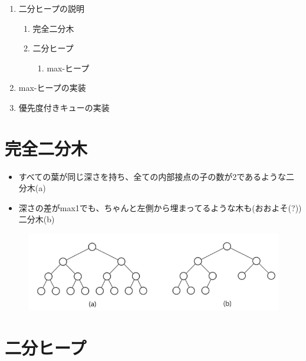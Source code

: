 \documentclass[a4paper,dvipdfmx]{jsarticle}
\makeatletter
\def\maxwidth{\ifdim\Gin@nat@width>\linewidth\linewidth
    \else\Gin@nat@width\fi}
\let\Oldincludegraphics\includegraphics
\renewcommand{\includegraphics}[1]{\Oldincludegraphics[width=.8\maxwidth]{#1}}
\providecommand{\tightlist}{%
      \setlength{\itemsep}{0pt}\setlength{\parskip}{0pt}}
\makeatother
\begin{document}
\begin{enumerate}
\def\labelenumi{\arabic{enumi}.}
\tightlist
\item
  二分ヒープの説明

  \begin{enumerate}
  \def\labelenumii{\arabic{enumii}.}
  \tightlist
  \item
    完全二分木
  \item
    二分ヒープ

    \begin{enumerate}
    \def\labelenumiii{\arabic{enumiii}.}
    \tightlist
    \item
      max-ヒープ
    \end{enumerate}
  \end{enumerate}
\item
  max-ヒープの実装
\item
  優先度付きキューの実装
\end{enumerate}

    \section{完全二分木}\label{ux5b8cux5168ux4e8cux5206ux6728}

\begin{itemize}
\tightlist
\item
  すべての葉が同じ深さを持ち、全ての内部接点の子の数が2であるような二分木(a)
\item
  深さの差がmax1でも、ちゃんと左側から埋まってるような木も(おおよそ(?))二分木(b)
\end{itemize}

\begin{figure}
\centering
\includegraphics{./imgs/CBT.png}
\caption{}
\end{figure}

    \section{二分ヒープ}\label{ux4e8cux5206ux30d2ux30fcux30d7}
\end{document}
